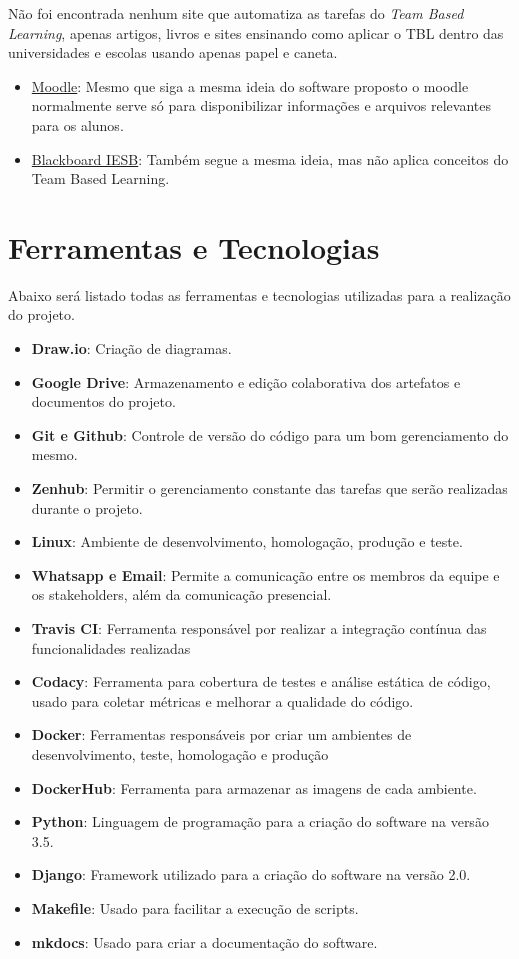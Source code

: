 Não foi encontrada nenhum site que automatiza as tarefas do \textit{Team Based Learning}, apenas artigos, livros e sites ensinando como aplicar o TBL dentro das universidades e escolas usando apenas papel e caneta.

\begin{itemize}
  \item \href{https://aprender.unb.br/}{Moodle}: Mesmo que siga a mesma ideia do software proposto o moodle normalmente serve só para disponibilizar informações e arquivos relevantes para os alunos.
  \item \href{https://iesb.blackboard.com/}{Blackboard IESB}: Também segue a mesma ideia, mas não aplica conceitos do Team Based Learning.
\end{itemize}

\section{Ferramentas e Tecnologias}

Abaixo será listado todas as ferramentas e tecnologias utilizadas para a realização do projeto.

\begin{itemize}
  \item \textbf{Draw.io}: Criação de diagramas.
  \item \textbf{Google Drive}: Armazenamento e edição colaborativa dos artefatos e documentos do projeto.
  \item \textbf{Git e Github}: Controle de versão do código para um bom gerenciamento do mesmo.
  \item \textbf{Zenhub}: Permitir o gerenciamento constante das tarefas que serão realizadas durante o projeto.
  \item \textbf{Linux}: Ambiente de desenvolvimento, homologação, produção e teste.
  \item \textbf{Whatsapp e Email}: Permite a comunicação entre os membros da equipe e os stakeholders, além da
    comunicação presencial.
  \item \textbf{Travis CI}: Ferramenta responsável por realizar a integração contínua das funcionalidades realizadas
  \item \textbf{Codacy}: Ferramenta para cobertura de testes e análise estática de código, usado para coletar métricas e
    melhorar a qualidade do código.
  \item \textbf{Docker}: Ferramentas responsáveis por criar um ambientes de desenvolvimento, teste, homologação e produção
  \item \textbf{DockerHub}: Ferramenta para armazenar as imagens de cada ambiente.
  \item \textbf{Python}: Linguagem de programação para a criação do software na versão 3.5.
  \item \textbf{Django}: Framework utilizado para a criação do software na versão 2.0.
  \item \textbf{Makefile}: Usado para facilitar a execução de scripts.
  \item \textbf{mkdocs}: Usado para criar a documentação do software.
\end{itemize}

